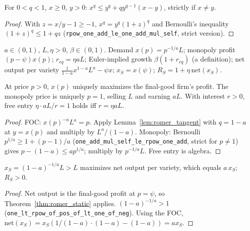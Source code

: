 \begin{lemma}
\label{lem:romer_tangent}
\leanok
For $0 < q < 1$, $x \ge 0$, $y > 0$: $x^q \le y^q + qy^{q-1}(x - y)$, strictly if $x \ne y$.
\end{lemma}
\begin{proof}
\leanok
With $z = x/y - 1 \ge -1$, $x^q = y^q(1+z)^q$ and Bernoulli's inequality $(1+z)^q \le 1 + qz$
(\texttt{rpow\_one\_add\_le\_one\_add\_mul\_self}, strict version).
\end{proof}

\begin{definition}
\label{def:romer}
\leanok
$a \in (0,1)$, $L, \eta > 0$, $\beta \in (0,1)$. Demand $x(p) = p^{-1/a}L$; monopoly profit $(p - \psi)x(p)$;
$r_{eq} = \eta aL$; Euler-implied growth $\beta(1 + r_{eq})$ (a definition); net output per variety
$\frac{1}{1-a}x^{1-a}L^a - \psi x$; $x_S = x(\psi)$; $R_S = 1 + \eta\,\mathrm{net}(x_S)$.
\end{definition}

\begin{theorem}
\label{thm:romer_static}
\leanok
{}
At price $p > 0$, $x(p)$ uniquely maximizes the final-good firm's profit. The monopoly price is uniquely $p = 1$,
selling $L$ and earning $aL$. With interest $r > 0$, free entry $\eta\cdot aL/r = 1$ holds iff $r = \eta aL$.
\end{theorem}
\begin{proof}
\leanok
FOC: $x(p)^{-a}L^a = p$. Apply Lemma~\ref{lem:romer_tangent} with $q = 1 - a$ at $y = x(p)$ and multiply by
$L^a/(1-a)$. Monopoly: Bernoulli $p^{1/a} \ge 1 + (p-1)/a$ (\texttt{one\_add\_mul\_self\_le\_rpow\_one\_add}, strict
for $p \ne 1$) gives $p - (1 - a) \le ap^{1/a}$; multiply by $p^{-1/a}L$. Free entry is algebra.
\end{proof}

\begin{theorem}
\label{thm:romer_planner_static}
\leanok
{}
$x_S = (1-a)^{-1/a}L > L$ maximizes net output per variety, which equals $a\,x_S$; $R_S > 0$.
\end{theorem}
\begin{proof}
\leanok
Net output is the final-good profit at $p = \psi$, so Theorem~\ref{thm:romer_static} applies. $(1-a)^{-1/a} > 1$
(\texttt{one\_lt\_rpow\_of\_pos\_of\_lt\_one\_of\_neg}). Using the FOC, $\mathrm{net}(x_S) = x_S(1/(1-a)\cdot(1-a) - (1-a)) = a x_S$.
\end{proof}

